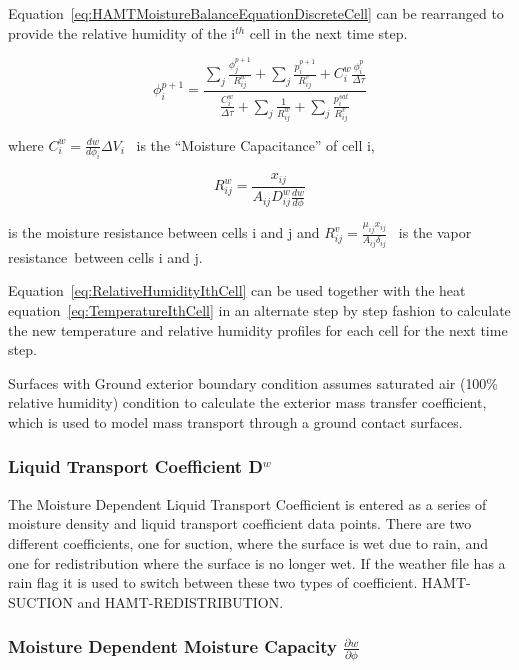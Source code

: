 Equation~\ref{eq:HAMTMoistureBalanceEquationDiscreteCell} can be rearranged to provide the relative humidity of the i\(^{th}\) cell in the next time step.

\begin{equation}
\phi_i^{p + 1} = \frac{{\sum\nolimits_j {\frac{{\phi_j^{p + 1}}}{{R_{ij}^w}}}  + \sum\nolimits_j {\frac{{p_i^{p + 1}}}{{R_{ij}^v}}}  + C_i^w\frac{{\phi_i^p}}{{\Delta \tau }}}}{{\frac{{C_i^w}}{{\Delta \tau }} + \sum\nolimits_j {\frac{1}{{R_{ij}^w}} + \sum\nolimits_j {\frac{{p_i^{sat}}}{{R_{ij}^v}}} } }}
\label{eq:RelativeHumidityIthCell}
\end{equation}

where \(C_i^w = \frac{dw}{d\phi_{i}}\Delta {V_i}\) ~is the ``Moisture Capacitance'' of cell i,

\begin{equation}
R_{ij}^w = \frac{{{x_{ij}}}}{{{A_{ij}}D_{ij}^w\frac{{dw}}{{d\phi }}}}
\end{equation}

is the moisture resistance between cells i and j and \(R_{ij}^v = \frac{\mu_{ij}x_{ij}}{A_{ij}\delta_{ij}}\) ~is the vapor resistance~between cells i and j.

Equation~\ref{eq:RelativeHumidityIthCell} can be used together with the heat equation~\ref{eq:TemperatureIthCell} in an alternate step by step fashion to calculate the new temperature and relative humidity profiles for each cell for the next time step.

Surfaces with Ground exterior boundary condition assumes saturated air ({100\%} relative humidity) condition to calculate the exterior mass transfer coefficient, which is used to model mass transport through a ground contact surfaces. 

\subsubsection{Liquid Transport Coefficient D\(^{w}\)}\label{liquid-transport-coefficient-dw}

The Moisture Dependent Liquid Transport Coefficient is entered as a series of moisture density and liquid transport coefficient data points. There are two different coefficients, one for suction, where the surface is wet due to rain, and one for redistribution where the surface is no longer wet. If the weather file has a rain flag it is used to switch between these two types of coefficient. HAMT-SUCTION and HAMT-REDISTRIBUTION.

\subsubsection{Moisture Dependent Moisture Capacity \(\frac{\partial w}{\partial \phi}\)}\label{moisture-dependent-moisture-capacity-fracpartial-wpartial-phi}

